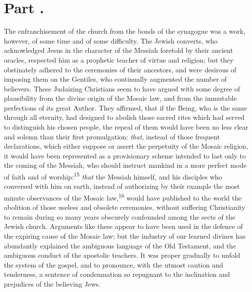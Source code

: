 \section{Part \thesection.}

The enfranchisement of the church from the bonds of the synagogue
was a work, however, of some time and of some difficulty. The
Jewish converts, who acknowledged Jesus in the character of the
Messiah foretold by their ancient oracles, respected him as a
prophetic teacher of virtue and religion; but they obstinately
adhered to the ceremonies of their ancestors, and were desirous
of imposing them on the Gentiles, who continually augmented the
number of believers. These Judaizing Christians seem to have
argued with some degree of plausibility from the divine origin of
the Mosaic law, and from the immutable perfections of its great
Author. They affirmed, that if the Being, who is the same through
all eternity, had designed to abolish those sacred rites which
had served to distinguish his chosen people, the repeal of them
would have been no less clear and solemn than their first
promulgation: \textit{that}, instead of those frequent declarations,
which either suppose or assert the perpetuity of the Mosaic
religion, it would have been represented as a provisionary scheme
intended to last only to the coming of the Messiah, who should
instruct mankind in a more perfect mode of faith and of worship:\textsuperscript{15}
\textit{that} the Messiah himself, and his disciples who conversed
with him on earth, instead of authorizing by their example the
most minute observances of the Mosaic law,\textsuperscript{16} would have
published to the world the abolition of those useless and
obsolete ceremonies, without suffering Christianity to remain
during so many years obscurely confounded among the sects of the
Jewish church. Arguments like these appear to have been used in
the defence of the expiring cause of the Mosaic law; but the
industry of our learned divines has abundantly explained the
ambiguous language of the Old Testament, and the ambiguous
conduct of the apostolic teachers. It was proper gradually to
unfold the system of the gospel, and to pronounce, with the
utmost caution and tenderness, a sentence of condemnation so
repugnant to the inclination and prejudices of the believing
Jews.


